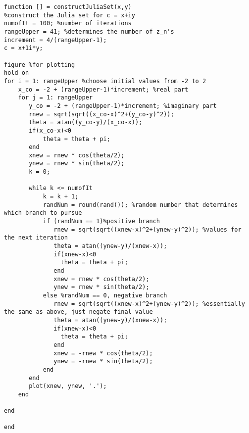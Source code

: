 \documentclass[11pt]{article}
\begin{document}
\begin{lstlisting}
function [] = constructJuliaSet(x,y)
%construct the Julia set for c = x+iy
numofIt = 100; %number of iterations
rangeUpper = 41; %determines the number of z_n's
increment = 4/(rangeUpper-1);
c = x+1i*y;

figure %for plotting
hold on
for i = 1: rangeUpper %choose initial values from -2 to 2
    x_co = -2 + (rangeUpper-1)*increment; %real part
    for j = 1: rangeUpper 
       y_co = -2 + (rangeUpper-1)*increment; %imaginary part 
       rnew = sqrt(sqrt((x_co-x)^2+(y_co-y)^2));
       theta = atan((y_co-y)/(x_co-x));
       if(x_co-x)<0
           theta = theta + pi;
       end
       xnew = rnew * cos(theta/2);
       ynew = rnew * sin(theta/2);
       k = 0;

       while k <= numofIt
           k = k + 1;
           randNum = round(rand()); %random number that determines which branch to pursue
           if (randNum == 1)%positive branch
              rnew = sqrt(sqrt((xnew-x)^2+(ynew-y)^2)); %values for the next iteration
              theta = atan((ynew-y)/(xnew-x));
              if(xnew-x)<0
                theta = theta + pi;
              end
              xnew = rnew * cos(theta/2);
              ynew = rnew * sin(theta/2);
           else %randNum == 0, negative branch
              rnew = sqrt(sqrt((xnew-x)^2+(ynew-y)^2)); %essentially the same as above, just negate final value
              theta = atan((ynew-y)/(xnew-x));
              if(xnew-x)<0
                theta = theta + pi;
              end
              xnew = -rnew * cos(theta/2);
              ynew = -rnew * sin(theta/2);
           end
       end
       plot(xnew, ynew, '.');
    end
    
end

end

\end{lstlisting}
\end{document}
